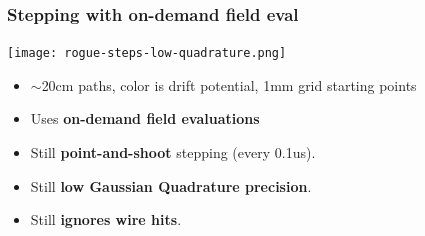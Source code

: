 \documentclass[xcolor=dvipsnames]{beamer}
\begin{document}
\begin{frame}
  \frametitle{Stepping with on-demand field eval}
  \texttt{[image: rogue-steps-low-quadrature.png]}
  \begin{itemize}\footnotesize
  \item $\sim$20cm paths, color is drift potential, 1mm grid starting points
  \item Uses \textbf{on-demand field evaluations}
  \item Still \textbf{point-and-shoot} stepping (every 0.1us).
  \item Still \textbf{low Gaussian Quadrature precision}.
  \item Still \textbf{ignores wire hits}.
  \end{itemize}
\end{frame}
\end{document}
